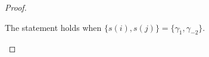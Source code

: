 \begin{proof}



	\begin{claim}
		The statement holds when $ \{ s(i),s(j) \} = \{ \gamma_{\tilde{1}}, \gamma_{-2} \}$.
	\end{claim}

	\begin{claimproof}
	\end{claimproof}


\end{proof}
